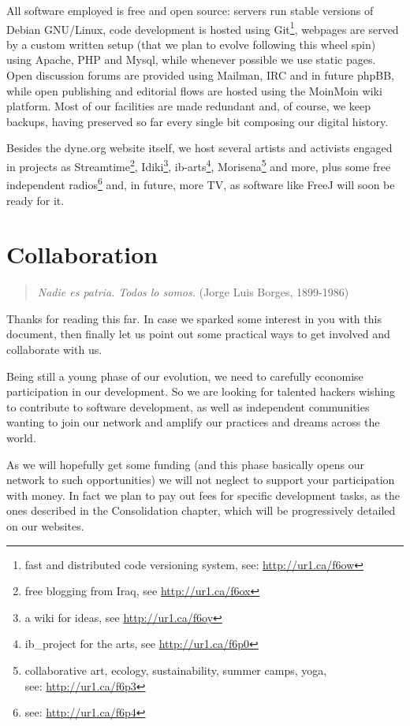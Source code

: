 All software employed is free and open source: servers run stable versions of
Debian GNU/Linux, code development is hosted using Git\footnote{fast and
distributed code versioning system, see: \url{http://ur1.ca/f6ow}}, webpages are
served by a custom written setup (that we plan to evolve following this wheel
spin) using Apache, PHP and Mysql, while whenever possible we use static pages.
Open discussion forums are provided using Mailman, IRC and in future phpBB,
while open publishing and editorial f\hbox{}lows are hosted using the MoinMoin
wiki platform. Most of our facilities are made redundant and, of course, we keep
backups, having preserved so far every single bit composing our digital history.

Besides the dyne.org website itself, we host several artists and activists
engaged in projects as Streamtime\footnote{free blogging from Iraq, see
\url{http://ur1.ca/f6ox}}, Idiki\footnote{a wiki for ideas, see
\url{http://ur1.ca/f6oy}}, ib-arts\footnote{ib\_project for the arts, see
\url{http://ur1.ca/f6p0}}, Morisena\footnote{collaborative art, ecology,
sustainability, summer camps, yoga,\\see: \url{http://ur1.ca/f6p3}} and more,
plus some free independent radios\footnote{see: \url{http://ur1.ca/f6p4}} and,
in future, more TV, as software like FreeJ will soon be ready for it.


\section{Collaboration}
\label{s:weaver_birds:collaboration}

\begin{quote}
\textit{Nadie es patria. Todos lo somos.} (Jorge Luis Borges, 1899-1986)
\end{quote}

Thanks for reading this far. In case we sparked some interest in you with this
document, then f\hbox{}inally let us point out some practical ways to get
involved and collaborate with us.

Being still a young phase of our evolution, we need to carefully economise
participation in our development. So we are looking for talented hackers wishing
to contribute to software development, as well as independent communities
wanting to join our network and amplify our practices and dreams across the
world.

As we will hopefully get some funding (and this phase basically opens our
network to such opportunities) we will not neglect to support your participation
with money. In fact we plan to pay out fees for specif\hbox{}ic development
tasks, as the ones described in the Consolidation chapter, which will be
progressively detailed on our websites.

